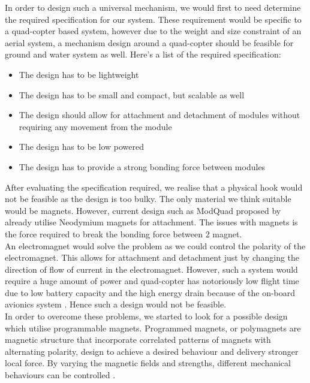 \documentclass[12pt,A4]{article}
\begin{document}
	In order to design such a universal mechanism, we would first to need determine the required specification for our system. These requirement would be specific to a quad-copter based system, however due to the weight and size constraint of an aerial system, a mechanism design around a quad-copter should be feasible for ground and water system as well. Here's a list of the required specification:
	
	\begin{itemize}
		\item The design has to be lightweight
		\item The design has to be small and compact, but scalable as well
		\item The design should allow for attachment and detachment of modules without requiring any movement from the module
		\item The design has to be low powered
		\item The design has to provide a strong bonding force between modules
	\end{itemize}
	
	After evaluating the specification required, we realise that a physical hook would not be feasible as the design is too bulky. The only material we think suitable would be magnets. However, current design such as ModQuad proposed by \citep{saldana2018modquad} already utilise Neodymium magnets for attachment. The issues with magnets is the force required to break the bonding force between 2 magnet. \\
	
	An electromagnet would solve the problem as we could control the polarity of the electromagnet. This allows for attachment and detachment just by changing the direction of flow of current in the electromagnet. However, such a system would require a huge amount of power and quad-copter has notoriously low flight time due to low battery capacity and the high energy drain because of the on-board avionics system \citep{lee2015autonomous}. Hence such a design would not be feasible.\\
	
	In order to overcome these problems, we started to look for a possible design which utilise programmable magnets. Programmed magnets, or polymagnets are magnetic structure that incorporate correlated patterns of magnets with alternating polarity, design to achieve a desired behaviour and delivery stronger local force. By varying the magnetic fields and strengths, different mechanical behaviours can be controlled \citep{polymagnet2008}.\\
	
\end{document}
